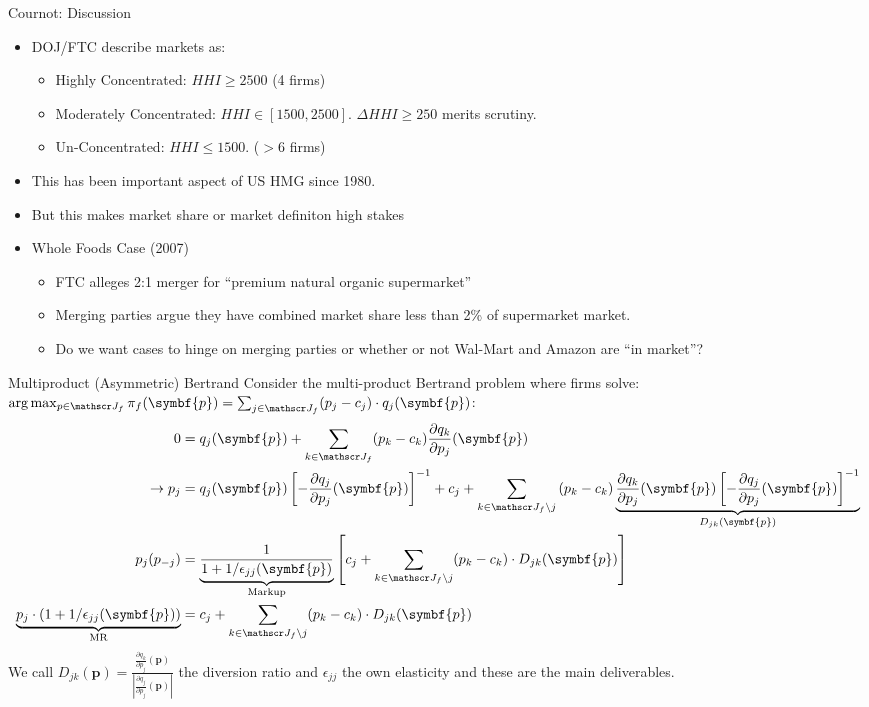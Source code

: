 \documentclass[aspectratio=169,10pt]{beamer}
\begin{document}
\begin{frame}{Cournot: Discussion}

\begin{itemize}
\item DOJ/FTC describe markets as:
\begin{itemize}
\item Highly Concentrated: $HHI \geq 2500$ (4 firms)
\item Moderately Concentrated: $HHI \in [1500,2500]$. $\Delta HHI \geq 250$ merits scrutiny.
\item Un-Concentrated: $HHI \leq 1500$. ($>6$ firms)
\end{itemize}
\item This has been important aspect of US HMG since 1980.
\item But this makes \alert{market share} or \alert{market definiton} high stakes
\item Whole Foods Case (2007)
\begin{itemize}
\item FTC alleges 2:1 merger for ``premium natural organic supermarket''
\item Merging parties argue they have combined market share less than 2\% of supermarket market.
\item Do we want cases to hinge on merging parties or whether or not Wal-Mart and Amazon are ``in market''?
\end{itemize}
\end{itemize}
\end{frame}



\begin{frame}{Multiproduct (Asymmetric) Bertrand}
\small
Consider the multi-product Bertrand problem where firms solve: $\arg \max_{p \in \calJ_f} \pi_f (\symbf{p}) = \sum_{j \in \calJ_f} (p_j - c_j) \cdot q_j(\symbf{p})$:
\begin{align*}
 0&= q_j(\symbf{p}) + \sum_{k \in \calJ_f} (p_k - c_k) \frac{\partial q_{k}}{\partial p_j}(\symbf{p}) \\
\rightarrow p_j &=q_{j}(\symbf{p}) \left[-\frac{\partial q_{j}}{\partial p_{j}}(\symbf{p})\right]^{-1} + c_{j} + \sum_{k \in \calJ_{f} \setminus j} \left(p_{k}-c_{k}\right) \underbrace{\frac{\partial q_{k}}{\partial p_{j}}(\symbf{p})\left[-\frac{\partial q_{j}}{\partial p_{j}}(\symbf{p})\right]^{-1}}_{D_{jk}(\symbf{p})}\\
p_j(p_{-j}) &= \underbrace{\frac{1}{1+1/\epsilon_{jj}(\symbf{p})}}_{\text{Markup}} \left[ c_j + \sum_{k \in \calJ_{f} \setminus j}  (p_k-c_k) \cdot  D_{jk} (\symbf{p}) \right]\\
\underbrace{p_j\cdot\left(1+1/\epsilon_{jj}(\symbf{p})\right)}_{\text{MR}} &=  c_j + \sum_{k \in \calJ_{f} \setminus j}  (p_k-c_k) \cdot  D_{jk} (\symbf{p})
\end{align*}
We call $D_{jk}(\symbf{p}) = \frac{\frac{\partial q_{k}}{\partial p_j}(\symbf{p})}{\left| \frac{\partial q_{j}}{\partial p_j}(\symbf{p}) \right|}$ the \alert{diversion ratio} and $\epsilon_{jj}$ the \alert{own elasticity} and these are the main deliverables.
\end{frame}
\end{document}
